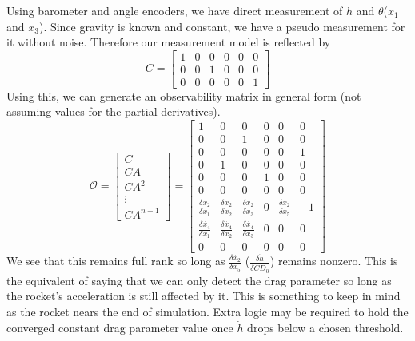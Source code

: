 \documentclass{article}
\begin{document}
  Using barometer and angle encoders, we have direct measurement of $h$ and $\theta$($x_1$ and $x_3$). Since gravity is known and constant, we have a pseudo measurement for it without noise. Therefore our measurement model is reflected by
  \begin{equation}
    C = \left[\begin{matrix} 1 & 0 & 0 & 0 & 0 & 0  \\
                             0 & 0 & 1 & 0 & 0 & 0  \\
                             0 & 0 & 0 & 0 & 0 & 1              \end{matrix}\right]
  \end{equation}
  Using this, we can generate an observability matrix in general form (not assuming values for the partial derivatives).
  \begin{equation}
    \mathcal O = \left[\begin{matrix} C  \\
                                      CA  \\
                                      CA^2 \\
                                      \vdots \\
                                      CA^{n-1}            \end{matrix}\right]
               = \left[\begin{matrix} 1 & 0 & 0 & 0 & 0 & 0  \\
                                      0 & 0 & 1 & 0 & 0 & 0  \\
                                      0 & 0 & 0 & 0 & 0 & 1  \\
                                      0 & 1 & 0 & 0 & 0 & 0  \\
                                      0 & 0 & 0 & 1 & 0 & 0  \\
                                      0 & 0 & 0 & 0 & 0 & 0  \\
                                      \frac{\delta \dot{x_2}}{\delta x_1}& \frac{\delta \dot{x_2}}{\delta x_2}& \frac{\delta \dot{x_2}}{\delta x_3}& 0& \frac{\delta \dot{x_2}}{\delta x_5}& -1 \\
                                      \frac{\delta \dot{x_4}}{\delta x_1}& \frac{\delta \dot{x_4}}{\delta x_2}& \frac{\delta \dot{x_4}}{\delta x_3}& 0&   0&  0 \\
                                      0  &   0&   0& 0&   0&  0 \end{matrix}\right]
  \end{equation}
  We see that this remains full rank so long as $\frac{\delta \dot{x_2}}{\delta x_5}$ ($\frac{\delta \ddot{h}}{\delta \bar{CD}_0}$) remains nonzero. This is the equivalent of saying that we can only detect the drag parameter so long as the rocket's acceleration is still affected by it. This is something to keep in mind as the rocket nears the end of simulation. Extra logic may be required to hold the converged constant drag parameter value once $\dot{h}$ drops below a chosen threshold.
\end{document}
